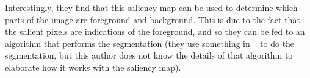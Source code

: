 Interestingly, they find that this saliency map can be used to determine which parts of the image
are foreground and background. This is due to the fact that the salient pixels are indications of
the foreground, and so they can be fed to an algorithm that performs the segmentation (they use
something in ~\cite{937505} to do the segmentation, but this author does not know the details of
that algorithm to elaborate how it works with the saliency map).